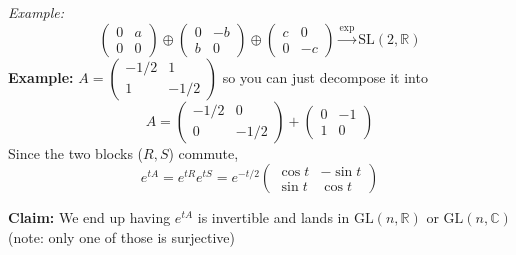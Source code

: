 \documentclass[12pt]{article}
\newcommand{\R}{\mathbb{R}}
\newcommand{\C}{\mathbb{C}}
\newcommand{\SL}{\text{SL}}
\newcommand{\GL}{\text{GL}}
\begin{document}
    \emph{Example:}
     \[\begin{pmatrix}
        0 & a\\ 
        0 & 0
     \end{pmatrix} \oplus \begin{pmatrix}
        0 & -b\\ 
        b & 0
     \end{pmatrix} \oplus \begin{pmatrix}
        c & 0\\ 
        0 & -c
     \end{pmatrix} \overset{\exp}{\longrightarrow} \SL(2, \R)\]
    \textbf{Example:} $A = \begin{pmatrix}
        -1/2 & 1\\ 
        1 & -1/2
    \end{pmatrix}$ so you can just decompose it into 
    \[A = \begin{pmatrix}
        -1/2 & 0\\ 
        0 & -1/2
    \end{pmatrix} + \begin{pmatrix}
        0 & -1\\ 
        1 & 0
    \end{pmatrix}\]
    Since the two blocks ($R, S$) commute, 
    \[e^{tA} = e^{tR} e^{tS} = e^{-t/2}\begin{pmatrix}
        \cos t & -\sin t\\ 
        \sin t & \cos t
    \end{pmatrix}\]

    \textbf{Claim:} We end up having $e^{tA}$ is invertible and lands in $\GL(n, \R)$ or $\GL(n, \C)$ (note: only one of those is surjective)
\end{document}
